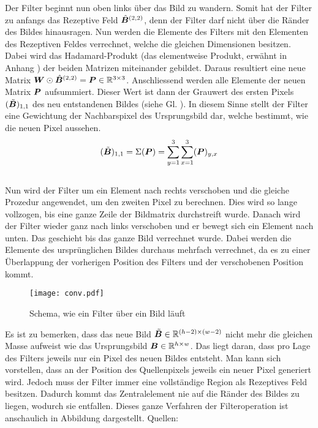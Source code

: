 \para{}
Der Filter beginnt nun oben links über das Bild zu wandern. Somit
hat der Filter zu anfangs das Rezeptive Feld $\hat{\bm{B}}^{(2,2)}$, denn der
Filter darf nicht über die Ränder des Bildes hinausragen.
Nun werden die Elemente des Filters mit den Elementen des Rezeptiven Feldes
verrechnet, welche die gleichen Dimensionen besitzen. Dabei wird das
Hadamard-Produkt (das elementweise Produkt, erwähnt in Anhang ) der beiden Matrizen miteinander
gebildet. Daraus resultiert eine neue Matrix $\bm{W} \odot
\hat{\bm{B}}^{(2,2)} = \bm{P} \in \mathbb{R}^{3 \times 3}$.
Anschliessend werden alle Elemente der neuen Matrix $\bm{P}$
aufsummiert. Dieser Wert ist dann der Grauwert des ersten Pixels
$(\tilde{\bm{B}})_{1,1}$ des neu entstandenen
Bildes (siehe Gl. ). In diesem Sinne stellt der Filter eine
Gewichtung der Nachbarspixel des Ursprungsbild dar, welche
bestimmt, wie die neuen Pixel aussehen.
\\
\begin{equation}\label{eq:filter1}
  (\tilde{\bm{B}})_{1,1} = \Sigma(\bm{P}) = \sum_{y=1}^3 \sum_{x=1}^3 (\bm{P})_{y,x}
\end{equation}
\\
Nun wird der Filter um ein Element nach rechts verschoben und die gleiche
Prozedur angewendet, um den zweiten Pixel zu berechnen. Dies
wird so lange vollzogen, bis eine ganze Zeile der Bildmatrix durchstreift wurde.
Danach wird der Filter wieder ganz nach links verschoben und er bewegt sich ein
Element nach unten. Das geschieht bis das ganze Bild verrechnet wurde.
Dabei werden die Elemente des ursprünglichen Bildes durchaus mehrfach
verrechnet, da es zu einer Überlappung der vorherigen Position des Filters und
der verschobenen Position kommt.
\para{}
\begin{figure}[h!]
  \centering
  \texttt{[image: conv.pdf]}
  \caption{Schema, wie ein Filter über ein Bild läuft}
  \label{fig:filteroperation}
\end{figure}
\para{}
Es ist zu bemerken, dass das neue Bild $\tilde{\bm{B}} \in \mathbb{R}^{(h-2) \times (w-2)}$ nicht mehr die gleichen Masse
aufweist wie das Ursprungsbild $\bm{B} \in \mathbb{R}^{h \times w}$. Das liegt daran, dass pro
Lage des Filters jeweils nur ein Pixel des neuen Bildes entsteht. Man kann
sich vorstellen, dass an der Position des Quellenpixels jeweils ein neuer
Pixel generiert wird. Jedoch muss der Filter immer eine vollständige Region als
Rezeptives Feld besitzen. Dadurch kommt das Zentralelement nie auf die Ränder des
Bildes zu liegen, wodurch sie entfallen.
\para{}
Dieses ganze Verfahren der Filteroperation ist anschaulich in Abbildung
 dargestellt.
\para{}
Quellen: \cite{deeplearning.ai:cnn} \cite{wiki:convolution}

